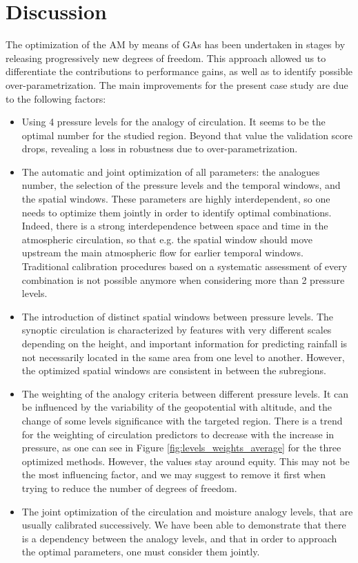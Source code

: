 \documentclass[review]{elsarticle}
\begin{document}
\section{Discussion}
\label{sec:discussion}

The optimization of the AM by means of GAs has been undertaken in stages by releasing progressively new degrees of freedom. This approach allowed us to differentiate the contributions to performance gains, as well as to identify possible over-parametrization. The main improvements for the present case study are due to the following factors:

\begin{itemize}
	\item Using 4 pressure levels for the analogy of circulation. It seems to be the optimal number for the studied region. Beyond that value the validation score drops, revealing a loss in robustness due to over-parametrization.
	\item The automatic and joint optimization of all parameters: the analogues number, the selection of the pressure levels and the temporal windows, and the spatial windows. These parameters are highly interdependent, so one needs to optimize them jointly in order to identify optimal combinations. Indeed, there is a strong interdependence between space and time in the atmospheric circulation, so that e.g. the spatial window should move upstream the main atmospheric flow for earlier temporal windows.	Traditional calibration procedures based on a systematic assessment of every combination is not possible anymore when considering more than 2 pressure levels.
	\item The introduction of distinct spatial windows between pressure levels. The synoptic circulation is characterized by features with very different scales depending on the height, and important information for predicting rainfall is not necessarily located in the same area from one level to another. However, the optimized spatial windows are consistent in between the subregions.
	\item The weighting of the analogy criteria between different pressure levels. It can be influenced by the variability of the geopotential with altitude, and the change of some levels significance with the targeted region. There is a trend for the weighting of circulation predictors to decrease with the increase in pressure, as one can see in Figure \ref{fig:levels_weights_average} for the three optimized methods. However, the values stay around equity. This may not be the most influencing factor, and we may suggest to remove it first when trying to reduce the number of degrees of freedom.
	\item The joint optimization of the circulation and moisture analogy levels, that are usually calibrated successively. We have been able to demonstrate that there is a dependency between the analogy levels, and that in order to approach the optimal parameters, one must consider them jointly.
\end{itemize}
\end{document}
